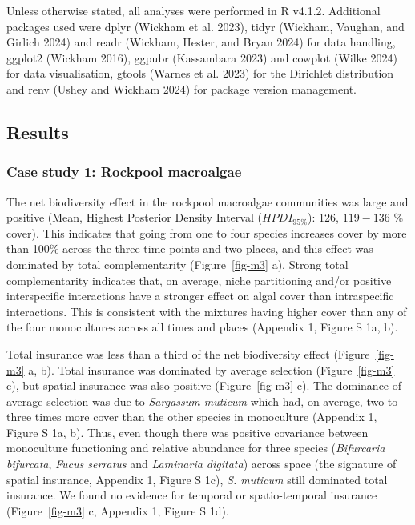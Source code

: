 \documentclass[
  letterpaper,
  DIV=11,
  numbers=noendperiod]{scrartcl}
\begin{document}
Unless otherwise stated, all analyses were performed in R v4.1.2.
Additional packages used were dplyr (Wickham et al. 2023), tidyr
(Wickham, Vaughan, and Girlich 2024) and readr (Wickham, Hester, and
Bryan 2024) for data handling, ggplot2 (Wickham 2016), ggpubr
(Kassambara 2023) and cowplot (Wilke 2024) for data visualisation,
gtools (Warnes et al. 2023) for the Dirichlet distribution and renv
(Ushey and Wickham 2024) for package version management.

\subsection{Results}\label{results}

\subsubsection{Case study 1: Rockpool
macroalgae}\label{case-study-1-rockpool-macroalgae-1}

The net biodiversity effect in the rockpool macroalgae communities was
large and positive (Mean, Highest Posterior Density Interval
(\(HPDI_{95\%}\)): 126, \(119 - 136\) \% cover). This indicates that
going from one to four species increases cover by more than 100\% across
the three time points and two places, and this effect was dominated by
total complementarity (Figure~\ref{fig-m3} a). Strong total
complementarity indicates that, on average, niche partitioning and/or
positive interspecific interactions have a stronger effect on algal
cover than intraspecific interactions. This is consistent with the
mixtures having higher cover than any of the four monocultures across
all times and places (Appendix 1, Figure S 1a, b).

Total insurance was less than a third of the net biodiversity effect
(Figure~\ref{fig-m3} a, b). Total insurance was dominated by average
selection (Figure~\ref{fig-m3} c), but spatial insurance was also
positive (Figure~\ref{fig-m3} c). The dominance of average selection was
due to \emph{Sargassum muticum} which had, on average, two to three
times more cover than the other species in monoculture (Appendix 1,
Figure S 1a, b). Thus, even though there was positive covariance between
monoculture functioning and relative abundance for three species
(\emph{Bifurcaria bifurcata}, \emph{Fucus serratus} and \emph{Laminaria
digitata}) across space (the signature of spatial insurance, Appendix 1,
Figure S 1c), \emph{S. muticum} still dominated total insurance. We
found no evidence for temporal or spatio-temporal insurance
(Figure~\ref{fig-m3} c, Appendix 1, Figure S 1d).
\end{document}
